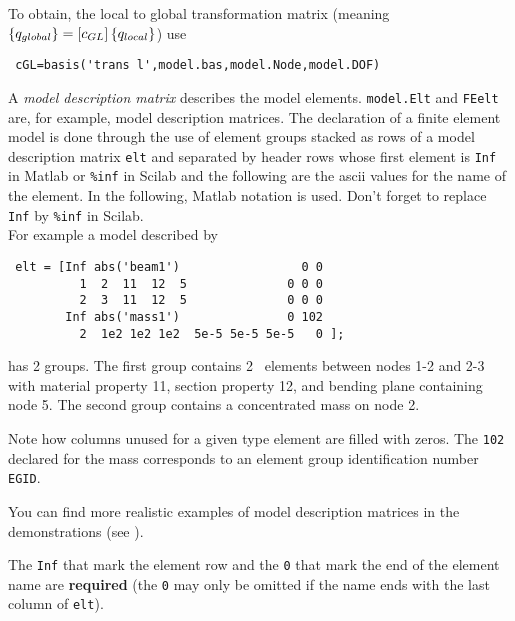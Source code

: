 To obtain, the local to global transformation matrix (meaning $\left\{q_{global}\right\} = \left[c_{GL}\right] \left\{q_{local}\right\}$) use
\begin{verbatim}
 cGL=basis('trans l',model.bas,model.Node,model.DOF)
\end{verbatim}


%

\noindent A {\sl model description matrix} describes the model elements. {\tt model.Elt} and {\tt FEelt} are, for example, model description matrices. The declaration of a finite element model is done through the use of element groups stacked as rows of a model description matrix {\tt elt} and separated by header rows whose first element is {\tt Inf} in Matlab or {\tt \%inf} in Scilab and the following are the {\sc ascii} values for the name of the element. In the following, Matlab notation is used. Don't forget to replace {\tt Inf} by {\tt \%inf} in Scilab. \\
For example a model described by 

\begin{verbatim}
 elt = [Inf abs('beam1')                 0 0
          1  2  11  12  5              0 0 0
          2  3  11  12  5              0 0 0
        Inf abs('mass1')               0 102
          2  1e2 1e2 1e2  5e-5 5e-5 5e-5   0 ];
\end{verbatim}

\noindent has 2 groups. The first group contains 2 \beam\ elements between nodes 1-2 and 2-3 with material property 11, section property 12, and bending plane containing node 5. The second group contains a concentrated mass on node 2.

Note how columns unused for a given type element are filled with zeros. The {\tt 102} declared for the mass corresponds to an element group identification number {\tt EGID}. 

You can find more realistic examples of model description matrices in the demonstrations (see ).


\lvs\noindent{}


\noindent The {\tt Inf} that mark the element row and the {\tt 0} that mark the end of the element name are {\bf required} (the {\tt 0} may only be omitted if the name ends with the last column of {\tt elt}).


